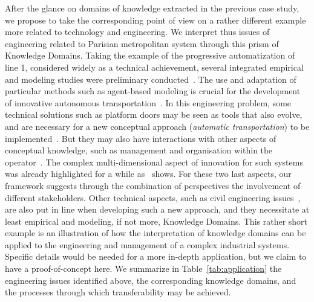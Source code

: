 \documentclass[runningheads,a4paper]{llncs2e/llncs}
\begin{document}
After the glance on domains of knowledge extracted in the previous case study, we propose to take the corresponding point of view on a rather different example more related to technology and engineering. We interpret thus issues of engineering related to Parisian metropolitan system through this prism of Knowledge Domains. Taking the example of the progressive automatization of line 1, considered widely as a technical achievement, several integrated empirical and modeling studies were preliminary conducted~\cite{belmonte2008automatisation}. The use and adaptation of particular methods such as agent-based modeling is crucial for the development of innovative autonomous transportation~\cite{balbo2016positionnement}. In this engineering problem, some technical solutions such as platform doors may be seen as tools that also evolve, and are necessary for a new conceptual approach (\emph{automatic transportation}) to be implemented~\cite{foot2005faut}. But they may also have interactions with other aspects of conceptual knowledge, such as management and organisation within the operator~\cite{foot1994ratp}. The complex multi-dimensional aspect of innovation for such systems was already highlighted for a while as~\cite{hatchuel1988stations} shows. For these two last aspects, our framework suggests through the combination of perspectives the involvement of different stakeholders. Other technical aspects, such as civil engineering issues~\cite{moreno2016etude}, are also put in line when developing such a new approach, and they necessitate at least empirical and modeling, if not more, Knowledge Domains. This rather short example is an illustration of how the interpretation of knowledge domains can be applied to the engineering and management of a complex industrial systems. Specific details would be needed for a more in-depth application, but we claim to have a proof-of-concept here. We summarize in Table~\ref{tab:application} the engineering issues identified above, the corresponding knowledge domains, and the processes through which transferability may be achieved.
\end{document}
